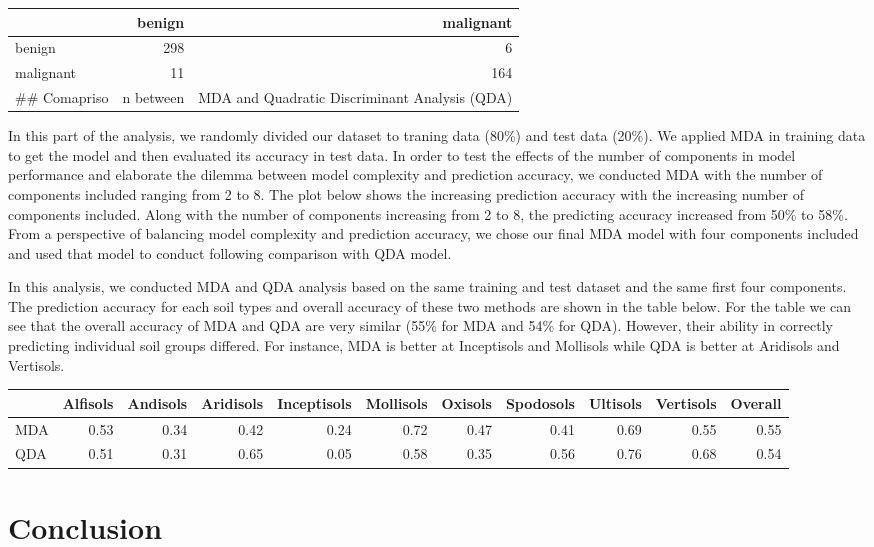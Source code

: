 \documentclass[]{article}
\begin{document}
\begin{longtable}[]{@{}lrr@{}}
\toprule
& benign & malignant\tabularnewline
\midrule
\endhead
benign & 298 & 6\tabularnewline
malignant & 11 & 164\tabularnewline
\#\# Comapriso & n between & MDA and Quadratic Discriminant Analysis
(QDA)\tabularnewline
\bottomrule
\end{longtable}

In this part of the analysis, we randomly divided our dataset to traning
data (80\%) and test data (20\%). We applied MDA in training data to get
the model and then evaluated its accuracy in test data. In order to test
the effects of the number of components in model performance and
elaborate the dilemma between model complexity and prediction accuracy,
we conducted MDA with the number of components included ranging from 2
to 8. The plot below shows the increasing prediction accuracy with the
increasing number of components included. Along with the number of
components increasing from 2 to 8, the predicting accuracy increased
from 50\% to 58\%. From a perspective of balancing model complexity and
prediction accuracy, we chose our final MDA model with four components
included and used that model to conduct following comparison with QDA
model.

In this analysis, we conducted MDA and QDA analysis based on the same
training and test dataset and the same first four components. The
prediction accuracy for each soil types and overall accuracy of these
two methods are shown in the table below. For the table we can see that
the overall accuracy of MDA and QDA are very similar (55\% for MDA and
54\% for QDA). However, their ability in correctly predicting individual
soil groups differed. For instance, MDA is better at Inceptisols and
Mollisols while QDA is better at Aridisols and Vertisols.

\begin{longtable}[]{@{}lrrrrrrrrrr@{}}
\toprule
& Alfisols & Andisols & Aridisols & Inceptisols & Mollisols & Oxisols &
Spodosols & Ultisols & Vertisols & Overall\tabularnewline
\midrule
\endhead
MDA & 0.53 & 0.34 & 0.42 & 0.24 & 0.72 & 0.47 & 0.41 & 0.69 & 0.55 &
0.55\tabularnewline
QDA & 0.51 & 0.31 & 0.65 & 0.05 & 0.58 & 0.35 & 0.56 & 0.76 & 0.68 &
0.54\tabularnewline
\bottomrule
\end{longtable}

\section{Conclusion}\label{conclusion}
\end{document}
